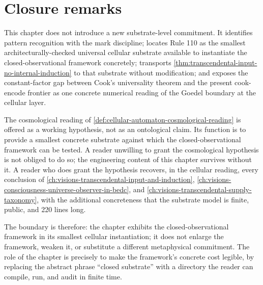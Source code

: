 \section{Closure remarks}
\label{sec:cellular-automaton-reading-closure}

This chapter does not introduce a new substrate-level commitment. It identifies pattern recognition with the mark discipline; locates Rule 110 as the smallest architecturally-checked universal cellular substrate available to instantiate the closed-observational framework concretely; transports \autoref{thm:transcendental-input-no-internal-induction} to that substrate without modification; and exposes the constant-factor gap between Cook's universality theorem and the present cook-encode frontier as one concrete numerical reading of the Goedel boundary at the cellular layer.

The cosmological reading of \autoref{def:cellular-automaton-cosmological-reading} is offered as a working hypothesis, not as an ontological claim. Its function is to provide a smallest concrete substrate against which the closed-observational framework can be tested. A reader unwilling to grant the cosmological hypothesis is not obliged to do so; the engineering content of this chapter survives without it. A reader who does grant the hypothesis recovers, in the cellular reading, every conclusion of \autoref{ch:visions-transcendental-input-and-induction}, \autoref{ch:visions-consciousness-universe-observer-in-bedc}, and \autoref{ch:visions-transcendental-supply-taxonomy}, with the additional concreteness that the substrate model is finite, public, and 220 lines long.

The boundary is therefore: the chapter exhibits the closed-observational framework in its smallest cellular instantiation; it does not enlarge the framework, weaken it, or substitute a different metaphysical commitment. The role of the chapter is precisely to make the framework's concrete cost legible, by replacing the abstract phrase ``closed substrate'' with a directory the reader can compile, run, and audit in finite time.

